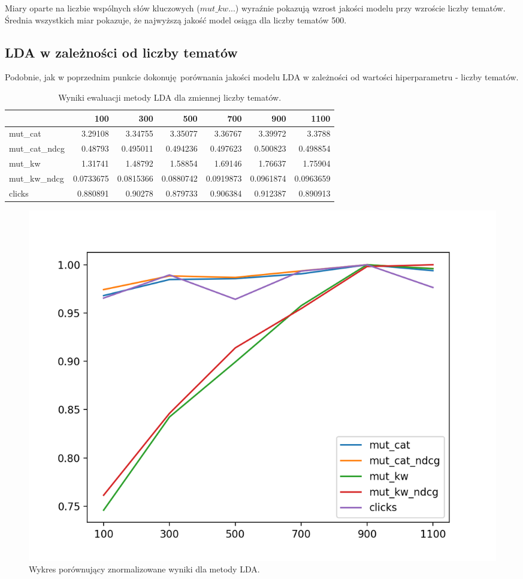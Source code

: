 \documentclass[pl]{minipw} %
\begin{document}
Miary oparte na liczbie wspólnych słów kluczowych ($mut\_kw...$) wyraźnie pokazują wzrost jakości modelu przy wzroście liczby tematów. Średnia wszystkich miar pokazuje, że najwyższą jakość model osiąga dla liczby tematów 500.

\subsection{LDA w zależności od liczby tematów}

Podobnie, jak w poprzednim punkcie dokonuję porównania jakości modelu LDA w zależności od wartości hiperparametru - liczby tematów.


\begin{table}[H]
	\centering
	\begin{tabular}{lrrrrrr}
		\hline
		&       100 &       300 &       500 &       700 &       900 &      1100 \\
		\hline
		mut\_cat      & 3.29108   & 3.34755   & 3.35077   & 3.36767   & 3.39972   & 3.3788    \\
		mut\_cat\_ndcg & 0.48793   & 0.495011  & 0.494236  & 0.497623  & 0.500823  & 0.498854  \\
		mut\_kw       & 1.31741   & 1.48792   & 1.58854   & 1.69146   & 1.76637   & 1.75904   \\
		mut\_kw\_ndcg  & 0.0733675 & 0.0815366 & 0.0880742 & 0.0919873 & 0.0961874 & 0.0963659 \\
		clicks       & 0.880891  & 0.90278   & 0.879733  & 0.906384  & 0.912387  & 0.890913  \\
		\hline
	\end{tabular}
	\caption{Wyniki ewaluacji metody LDA dla zmiennej liczby tematów.}
\end{table}

\begin{figure}[H]
	\centering
	\includegraphics[width=1\textwidth]{img/results/lda.png}
	\caption{Wykres porównujący znormalizowane wyniki dla metody LDA.}
\end{figure}
\end{document}
